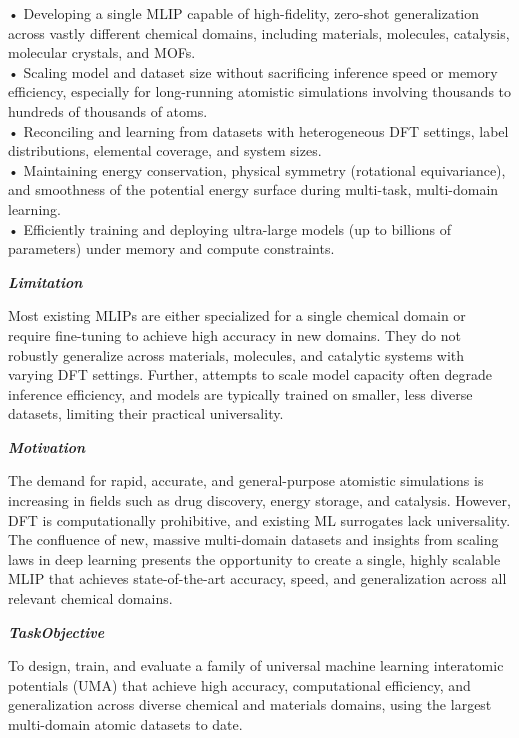 \begin{tcolorbox}[
    breakable,
    title={Example of Idea Generation in Physics},
    colback=LighterGray,
    colframe=DeepPurple,
    colbacktitle=DeepPurple,
    coltitle=White,
]
• Developing a single MLIP capable of high-fidelity, zero-shot generalization across vastly different chemical domains, including materials, molecules, catalysis, molecular crystals, and MOFs. \\
• Scaling model and dataset size without sacrificing inference speed or memory efficiency, especially for long-running atomistic simulations involving thousands to hundreds of thousands of atoms. \\
• Reconciling and learning from datasets with heterogeneous DFT settings, label distributions, elemental coverage, and system sizes. \\
• Maintaining energy conservation, physical symmetry (rotational equivariance), and smoothness of the potential energy surface during multi-task, multi-domain learning. \\
• Efficiently training and deploying ultra-large models (up to billions of parameters) under memory and compute constraints. 

\textbf{\emph{\textcolor{CaseOrange}{Limitation}}}

Most existing MLIPs are either specialized for a single chemical domain or require fine-tuning to
achieve high accuracy in new domains. They do not robustly generalize across materials, molecules,
and catalytic systems with varying DFT settings. Further, attempts to scale model capacity often
degrade inference efficiency, and models are typically trained on smaller, less diverse datasets,
limiting their practical universality.

\textbf{\emph{\textcolor{CaseOrange}{Motivation}}}

The demand for rapid, accurate, and general-purpose atomistic simulations is increasing in fields
such as drug discovery, energy storage, and catalysis. However, DFT is computationally prohibitive,
and existing ML surrogates lack universality. The confluence of new, massive multi-domain datasets
and insights from scaling laws in deep learning presents the opportunity to create a single, highly
scalable MLIP that achieves state-of-the-art accuracy, speed, and generalization across all relevant
chemical domains.

\textbf{\emph{\textcolor{CaseOrange}{TaskObjective}}}

To design, train, and evaluate a family of universal machine learning interatomic potentials (UMA)
that achieve high accuracy, computational efficiency, and generalization across diverse chemical and
materials domains, using the largest multi-domain atomic datasets to date.


\end{tcolorbox}
